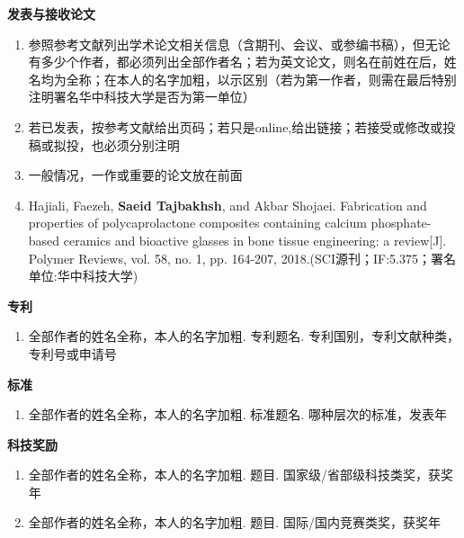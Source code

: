 \begin{publications}
\noindent
\textbf{发表与接收论文}
\renewcommand{\labelenumi}{[\arabic{enumi}]}
\begin{enumerate}
\item 参照参考文献列出学术论文相关信息（含期刊、会议、或参编书稿），但无论有多少个作者，都必须列出全部作者名；若为英文论文，则名在前姓在后，姓名均为全称；在本人的名字加粗，以示区别（若为第一作者，则需在最后特别注明署名华中科技大学是否为第一单位）
\item 若已发表，按参考文献给出页码；若只是online,给出链接；若接受或修改或投稿或拟投，也必须分别注明
\item 一般情况，一作或重要的论文放在前面
\item Hajiali, Faezeh, \textbf{Saeid Tajbakhsh}, and Akbar Shojaei. Fabrication and properties of polycaprolactone composites containing calcium phosphate-based ceramics and bioactive glasses in bone tissue engineering: a review[J]. Polymer Reviews, vol. 58, no. 1, pp. 164-207, 2018.(SCI源刊；IF:5.375；署名单位:华中科技大学)
\end{enumerate}
\textbf{专\hspace{2em}利}
\renewcommand{\labelenumi}{[\arabic{enumi}]}
\begin{enumerate}
\item 全部作者的姓名全称，本人的名字加粗. 专利题名. 专利国别，专利文献种类，专利号或申请号
\end{enumerate}
\textbf{标\hspace{2em}准}
\renewcommand{\labelenumi}{[\arabic{enumi}]}
\begin{enumerate}
\item 全部作者的姓名全称，本人的名字加粗. 标准题名. 哪种层次的标准，发表年
\end{enumerate}
\textbf{科技奖励}
\renewcommand{\labelenumi}{[\arabic{enumi}]}
\begin{enumerate}
\item 全部作者的姓名全称，本人的名字加粗. 题目. 国家级/省部级科技类奖，获奖年
\item 全部作者的姓名全称，本人的名字加粗. 题目. 国际/国内竞赛类奖，获奖年
\end{enumerate}
\end{publications}
